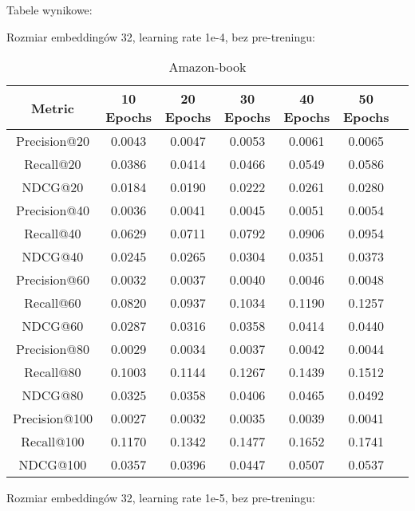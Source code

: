 \documentclass[a4paper,onecolumn]{LTJournalArticle}
\begin{document}
	Tabele wynikowe:
	
	Rozmiar embeddingów 32, learning rate 1e-4, bez pre-treningu:
	\begin{table}[h]
		\centering
		\caption{Amazon-book}
		\label{tab:metrics_transposed}
		\scriptsize %
		\begin{tabular}{ccccccc}
			\toprule
			Metric & 10 Epochs & 20 Epochs & 30 Epochs & 40 Epochs & 50 Epochs \\
			\midrule
			Precision@20  & 0.0043  & 0.0047  & 0.0053  & 0.0061  & 0.0065  \\
			Recall@20     & 0.0386  & 0.0414  & 0.0466  & 0.0549  & 0.0586  \\
			NDCG@20       & 0.0184  & 0.0190  & 0.0222  & 0.0261  & 0.0280  \\
			Precision@40  & 0.0036  & 0.0041  & 0.0045  & 0.0051  & 0.0054  \\
			Recall@40     & 0.0629  & 0.0711  & 0.0792  & 0.0906  & 0.0954  \\
			NDCG@40       & 0.0245  & 0.0265  & 0.0304  & 0.0351  & 0.0373  \\
			Precision@60  & 0.0032  & 0.0037  & 0.0040  & 0.0046  & 0.0048  \\
			Recall@60     & 0.0820  & 0.0937  & 0.1034  & 0.1190  & 0.1257  \\
			NDCG@60       & 0.0287  & 0.0316  & 0.0358  & 0.0414  & 0.0440  \\
			Precision@80  & 0.0029  & 0.0034  & 0.0037  & 0.0042  & 0.0044  \\
			Recall@80     & 0.1003  & 0.1144  & 0.1267  & 0.1439  & 0.1512  \\
			NDCG@80       & 0.0325  & 0.0358  & 0.0406  & 0.0465  & 0.0492  \\
			Precision@100 & 0.0027  & 0.0032  & 0.0035  & 0.0039  & 0.0041  \\
			Recall@100    & 0.1170  & 0.1342  & 0.1477  & 0.1652  & 0.1741  \\
			NDCG@100      & 0.0357  & 0.0396  & 0.0447  & 0.0507  & 0.0537  \\
			\bottomrule
		\end{tabular}
	\end{table}
	Rozmiar embeddingów 32, learning rate 1e-5, bez pre-treningu:
\end{document}
